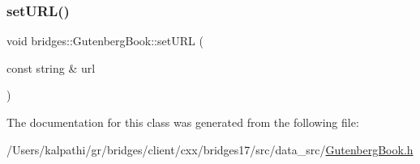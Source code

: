\mbox{\label{classbridges_1_1_gutenberg_book_aa60ee0598e6726611f1b4fe6cdb53748}} 
\subsubsection{\texorpdfstring{set\+U\+R\+L()}{setURL()}}
{\footnotesize\ttfamily void bridges\+::\+Gutenberg\+Book\+::set\+U\+RL (\begin{DoxyParamCaption}\item[{const string \&}]{url }\end{DoxyParamCaption})\hspace{0.3cm}{\ttfamily [inline]}}



The documentation for this class was generated from the following file\+:\begin{DoxyCompactItemize}
\item 
/\+Users/kalpathi/gr/bridges/client/cxx/bridges17/src/data\+\_\+src/\mbox{\hyperlink{_gutenberg_book_8h}{Gutenberg\+Book.\+h}}\end{DoxyCompactItemize}
